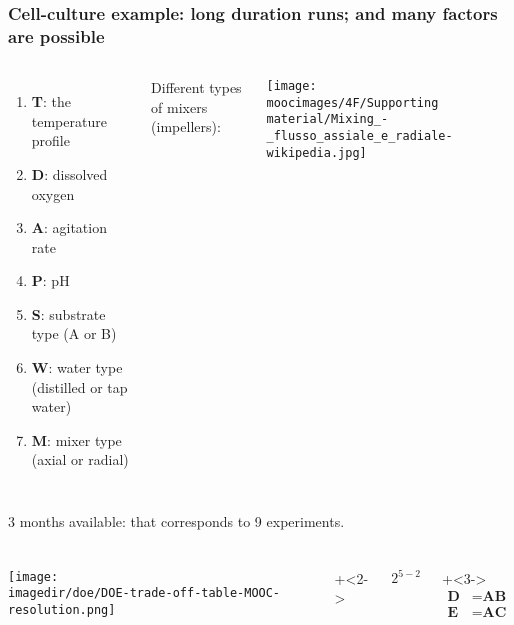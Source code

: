 \documentclass[handout,11pt,aspectratio=169,mathserif]{beamer}
\begin{document}
\begin{frame}\frametitle{Cell-culture example: long duration runs; and many factors are possible}
	\begin{columns}[c]
			\begin{enumerate}
				\item	\textbf{T}: the temperature profile
				\item	\textbf{D}: dissolved oxygen
				\item	\textbf{A}: agitation rate
				\item	\textbf{P}: pH
				\item	\textbf{S}: substrate type (A or B)
				\item	\textbf{W}: water type (distilled or tap water)
				\item	\textbf{M}: mixer type (axial or radial)
		
			\end{enumerate}
		
			{\color{blue} \small Different types of mixers (impellers):} 
			
			\vspace{0.2cm}
			
			\centerline{\texttt{[image: \\moocimages/4F/Supporting material/Mixing\_-\_flusso\_assiale\_e\_radiale-wikipedia.jpg]}}
			
	\end{columns}

	\vfill
	3 months available: {\color{myOrange} that corresponds to 9 experiments}.
	
\end{frame}

\begin{frame}\frametitle{}
	\begin{columns}[T]
			\texttt{[image: \\imagedir/doe/DOE-trade-off-table-MOOC-resolution.png]}
		
			
			\onslide+<2->{
				\vspace{2cm}
				{\Huge
					$2^{5-2}$
				} 
			 
				\vspace{2cm}
				\onslide+<3->{ 
					\begin{align*}
						\textbf{D} &= \textbf{AB}\\
						\textbf{E}\, &= \textbf{AC} 
					\end{align*}
				}
			}
	\end{columns}
	
\end{frame}
\end{document}
